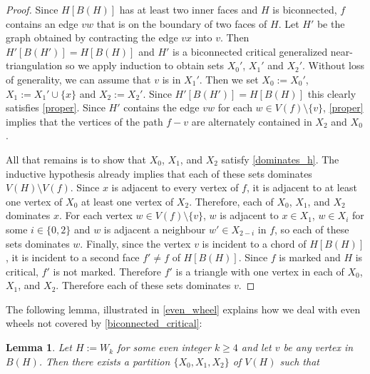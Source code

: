 \documentclass[12pt]{article}
\newtheorem{lem}{Lemma}
\theoremstyle{definition}
\newcommand{\pat}[1]{[\textcolor{red}{PM: #1}]}
\begin{document}
\begin{proof}
  Since $H[B(H)]$ has at least two inner faces and $H$ is biconnected, $f$ contains an edge $vw$ that is on the boundary of two faces of $H$.  Let $H'$ be the graph obtained by contracting the edge $vx$ into $v$. Then $H'[B(H')]=H[B(H)]$ and $H'$ is a biconnected critical generalized near-triangulation so we apply induction to obtain sets $X_0'$, $X_1'$ and $X_2'$.  Without loss of generality, we can assume that $v$ is in $X_1'$.  Then we set $X_0:=X_0'$, $X_1:=X_1'\cup\{x\}$ and $X_2:=X_2'$. Since $H'[B(H')]=H[B(H)]$ this clearly satisfies \cref{proper}.  Since $H'$ contains the edge $vw$ for each $w\in V(f)\setminus\{v\}$, \cref{proper} implies that the vertices of the path $f-v$ are alternately contained in $X_2$ and $X_0$.

  All that remains is to show that $X_0$, $X_1$, and $X_2$ satisfy \cref{dominates_h}.  The inductive hypothesis already implies that each of these sets dominates $V(H)\setminus V(f)$.  Since $x$ is adjacent to every vertex of $f$, it is adjacent to at least one vertex of $X_0$ at least one vertex of $X_2$.  Therefore, each of $X_0$, $X_1$, and $X_2$ dominates $x$.  For each vertex $w\in V(f)\setminus\{v\}$, $w$ is adjacent to $x\in X_1$, $w\in X_{i}$ for some $i\in\{0,2\}$ and $w$ is adjacent a neighbour $w'\in X_{2-i}$ in $f$, so each of these sets dominates $w$.  Finally, since the vertex $v$ is incident to a chord of $H[B(H)]$, it is incident to a second face $f'\neq f$ of $H[B(H)]$.  Since $f$ is marked and $H$ is critical, $f'$ is not marked.  Therefore $f'$ is a triangle with one vertex in each of $X_0$, $X_1$, and $X_2$. Therefore each of these sets dominates $v$.
\end{proof}

The following lemma, illustrated in \cref{even_wheel}
 explains how we deal with even wheels not covered by \cref{biconnected_critical}:

\begin{lem}\label{wheelie}
  Let $H:=W_k$ for some even integer $k\ge 4$ and let $v$ be any vertex in $B(H)$.  Then there exists a partition $\{X_0,X_1,X_2\}$ of $V(H)$ such that
\end{lem}
\end{document}
